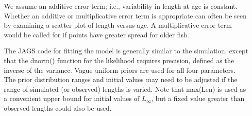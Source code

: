 \documentclass[
]{krantz}
\begin{document}
We assume an additive error term; i.e., variability in length at age is constant. Whether an additive or multiplicative error term is appropriate can often be seen by examining a scatter plot of length versus age. A multiplicative error term would be called for if points have greater spread for older fish.

The JAGS code for fitting the model is generally similar to the simulation, except that the dnorm() function for the likelihood requires precision, defined as the inverse of the variance. Vague uniform priors are used for all four parameters. The prior distribution ranges and initial values may need to be adjusted if the range of simulated (or observed) lengths is varied. Note that max(Len) is used as a convenient upper bound for initial values of \(L_\infty\), but a fixed value greater than observed lengths could also be used.
\end{document}
